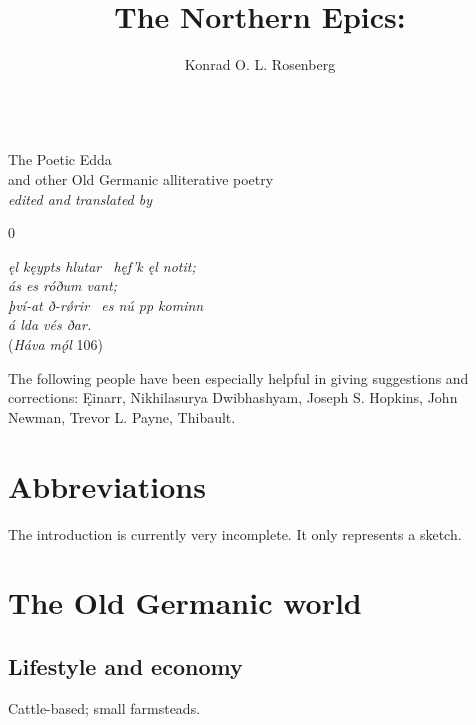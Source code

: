 \title{The Northern Epics:}
\author{Konrad O. L. Rosenberg}

\begin{titlingpage}
  \makeatletter
  \centering
  \HUGE \@title \\
  \Huge The Poetic Edda \\
  \Large and other Old Germanic alliterative poetry \\
  \large\emph{edited and translated by} \\
  \huge \@author
  \makeatother
\end{titlingpage}

\newpage\thispagestyle{empty}0

\begin{center}{\large \emph{ęl kęypts hlutar \hld\ hęf’k ęl notit; \\
ás es róðum vant; \\
því-at ð-rǿrir \hld\ es nú pp kominn \\
á lda vés ðar.}} \\

(\emph{Háva mǫ́l} 106)\end{center}

The following people have been especially helpful in giving suggestions and corrections: Ęinarr, Nikhilasurya Dwibhashyam, Joseph S. Hopkins, John Newman, Trevor L. Payne, Thibault.

\newpage\thispagestyle{empty}

\tableofcontents

\newpage

\thispagestyle{empty}\section{Abbreviations}

\newpage


The introduction is currently very incomplete. It only represents a sketch.

\section{The Old Germanic world}

  \subsection{Lifestyle and economy}
    Cattle-based; small farmsteads.
